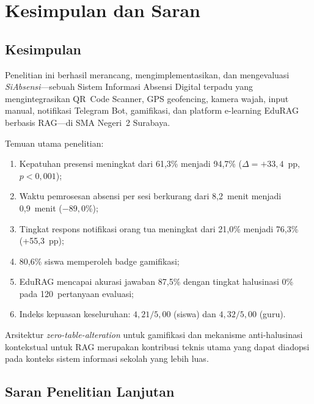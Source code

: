 \documentclass[12pt,a4paper]{article}
\newcommand{\edurag}{EduRAG}
\newcommand{\sistem}{\textit{SiAbsensi}}
\begin{document}
\section{Kesimpulan dan Saran}
\label{sec:conclusion}

\subsection{Kesimpulan}

Penelitian ini berhasil merancang, mengimplementasikan, dan mengevaluasi
\sistem{}---sebuah Sistem Informasi Absensi Digital terpadu yang
mengintegrasikan QR~Code Scanner, GPS geofencing, kamera wajah, input
manual, notifikasi Telegram Bot, gamifikasi, dan platform e-learning
\edurag{} berbasis RAG---di SMA Negeri~2 Surabaya.

Temuan utama penelitian:
\begin{enumerate}
  \item Kepatuhan presensi meningkat dari 61,3\% menjadi 94,7\%
        ($\Delta = +33{,}4$~pp, $p < 0{,}001$);
  \item Waktu pemrosesan absensi per sesi berkurang dari 8,2~menit
        menjadi 0,9~menit ($-89{,}0\%$);
  \item Tingkat respons notifikasi orang tua meningkat dari 21,0\%
        menjadi 76,3\% (+55,3~pp);
  \item 80,6\% siswa memperoleh badge gamifikasi;
  \item \edurag{} mencapai akurasi jawaban 87,5\% dengan tingkat
        halusinasi 0\% pada 120~pertanyaan evaluasi;
  \item Indeks kepuasan keseluruhan: $4{,}21/5{,}00$ (siswa) dan
        $4{,}32/5{,}00$ (guru).
\end{enumerate}

Arsitektur \textit{zero-table-alteration} untuk gamifikasi dan
mekanisme anti-halusinasi kontekstual untuk RAG merupakan kontribusi
teknis utama yang dapat diadopsi pada konteks sistem informasi sekolah
yang lebih luas.

\subsection{Saran Penelitian Lanjutan}
\end{document}
